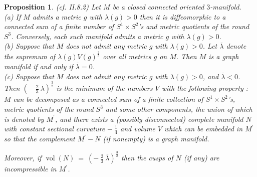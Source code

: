 \documentclass[12pt]{amsart}
\newcommand{\vol}{\operatorname{vol}}
\numberwithin{equation}{section}
\theoremstyle{plain}
\newtheorem{proposition}[equation]{Proposition}
\theoremstyle{definition}
\theoremstyle{remark}
\begin{document}
\begin{proposition} (cf. II.8.2) \label{propII.8.2}
Let $M$ be a closed connected oriented $3$-manifold. \\
(a) If $M$ admits a metric $g$ with $\lambda(g) > 0$ then it is
diffeomorphic to a connected sum of a finite number of
$S^1 \times S^2$'s and metric quotients of the round $S^3$.
Conversely, each such manifold admits a metric $g$ with 
$\lambda(g) > 0$. \\
(b) Suppose that $M$ does not admit any metric $g$ with
$\lambda(g) > 0$. Let $\overline{\lambda}$ denote the
supremum of $\lambda(g) V(g)^{\frac23}$ over all metrics $g$ on $M$.
Then $M$ is a graph manifold if and only if $\overline{\lambda}
= 0$. \\
(c) Suppose that $M$ does not admit any metric $g$ with
$\lambda(g) > 0$, and $\overline{\lambda} < 0$.
Then
$\left( - \: \frac23 \: \overline{\lambda}
\right)^{\frac32}$ is the minimum
of the numbers
$V$ with the following property : $M$ can be decomposed as a connected sum
of a finite collection of $S^1 \times S^2$'s, metric quotients of the round
$S^3$ and some other components, the union of which is denoted by
$M^\prime$, and there exists a (possibly disconnected) complete
manifold $N$ with constant sectional curvature $- \: \frac14$ and
volume $V$ which can be embedded in $M^\prime$ so that the
complement $M^\prime - N$ (if nonempty) is a graph manifold.  

Moreover, if
$\vol(N) \: = \: \left( - \: \frac23 \: \overline{\lambda}
\right)^{\frac32}$
then the cusps of $N$ (if any) are incompressible in $M^\prime$. 
\end{proposition}
\end{document}
